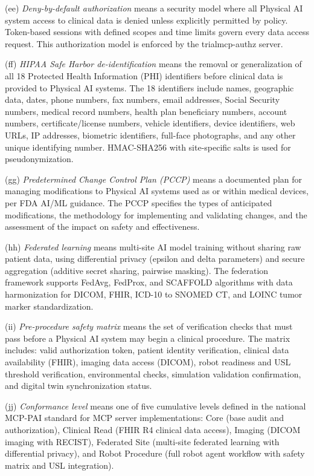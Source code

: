 \documentclass[11pt]{article}
\begin{document}
(ee) \textit{Deny-by-default authorization} means a security model where all Physical AI system access to clinical data is denied unless explicitly permitted by policy. Token-based sessions with defined scopes and time limits govern every data access request. This authorization model is enforced by the trialmcp-authz server.

(ff) \textit{HIPAA Safe Harbor de-identification} means the removal or generalization of all 18 Protected Health Information (PHI) identifiers before clinical data is provided to Physical AI systems. The 18 identifiers include names, geographic data, dates, phone numbers, fax numbers, email addresses, Social Security numbers, medical record numbers, health plan beneficiary numbers, account numbers, certificate/license numbers, vehicle identifiers, device identifiers, web URLs, IP addresses, biometric identifiers, full-face photographs, and any other unique identifying number. HMAC-SHA256 with site-specific salts is used for pseudonymization.

(gg) \textit{Predetermined Change Control Plan (PCCP)} means a documented plan for managing modifications to Physical AI systems used as or within medical devices, per FDA AI/ML guidance. The PCCP specifies the types of anticipated modifications, the methodology for implementing and validating changes, and the assessment of the impact on safety and effectiveness.

(hh) \textit{Federated learning} means multi-site AI model training without sharing raw patient data, using differential privacy (epsilon and delta parameters) and secure aggregation (additive secret sharing, pairwise masking). The federation framework supports FedAvg, FedProx, and SCAFFOLD algorithms with data harmonization for DICOM, FHIR, ICD-10 to SNOMED CT, and LOINC tumor marker standardization.

(ii) \textit{Pre-procedure safety matrix} means the set of verification checks that must pass before a Physical AI system may begin a clinical procedure. The matrix includes: valid authorization token, patient identity verification, clinical data availability (FHIR), imaging data access (DICOM), robot readiness and USL threshold verification, environmental checks, simulation validation confirmation, and digital twin synchronization status.

(jj) \textit{Conformance level} means one of five cumulative levels defined in the national MCP-PAI standard for MCP server implementations: Core (base audit and authorization), Clinical Read (FHIR R4 clinical data access), Imaging (DICOM imaging with RECIST), Federated Site (multi-site federated learning with differential privacy), and Robot Procedure (full robot agent workflow with safety matrix and USL integration).
\end{document}
